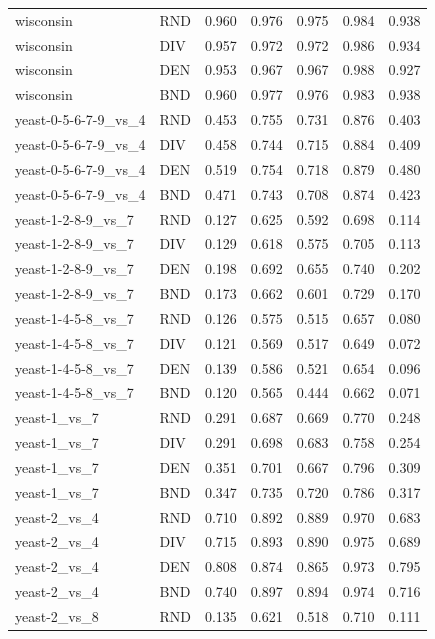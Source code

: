 \documentclass[10pt,a4paper]{article}
\begin{document}
\begin{longtable}{lllllrr}
wisconsin & RND & 0.960 & 0.976 & 0.975 & 0.984 & 0.938 \\
wisconsin & DIV & 0.957 & 0.972 & 0.972 & 0.986 & 0.934 \\
wisconsin & DEN & 0.953 & 0.967 & 0.967 & 0.988 & 0.927 \\
wisconsin & BND & 0.960 & 0.977 & 0.976 & 0.983 & 0.938 \\
yeast-0-5-6-7-9\_vs\_4 & RND & 0.453 & 0.755 & 0.731 & 0.876 & 0.403 \\
yeast-0-5-6-7-9\_vs\_4 & DIV & 0.458 & 0.744 & 0.715 & 0.884 & 0.409 \\
yeast-0-5-6-7-9\_vs\_4 & DEN & 0.519 & 0.754 & 0.718 & 0.879 & 0.480 \\
yeast-0-5-6-7-9\_vs\_4 & BND & 0.471 & 0.743 & 0.708 & 0.874 & 0.423 \\
yeast-1-2-8-9\_vs\_7 & RND & 0.127 & 0.625 & 0.592 & 0.698 & 0.114 \\
yeast-1-2-8-9\_vs\_7 & DIV & 0.129 & 0.618 & 0.575 & 0.705 & 0.113 \\
yeast-1-2-8-9\_vs\_7 & DEN & 0.198 & 0.692 & 0.655 & 0.740 & 0.202 \\
yeast-1-2-8-9\_vs\_7 & BND & 0.173 & 0.662 & 0.601 & 0.729 & 0.170 \\
yeast-1-4-5-8\_vs\_7 & RND & 0.126 & 0.575 & 0.515 & 0.657 & 0.080 \\
yeast-1-4-5-8\_vs\_7 & DIV & 0.121 & 0.569 & 0.517 & 0.649 & 0.072 \\
yeast-1-4-5-8\_vs\_7 & DEN & 0.139 & 0.586 & 0.521 & 0.654 & 0.096 \\
yeast-1-4-5-8\_vs\_7 & BND & 0.120 & 0.565 & 0.444 & 0.662 & 0.071 \\
yeast-1\_vs\_7 & RND & 0.291 & 0.687 & 0.669 & 0.770 & 0.248 \\
yeast-1\_vs\_7 & DIV & 0.291 & 0.698 & 0.683 & 0.758 & 0.254 \\
yeast-1\_vs\_7 & DEN & 0.351 & 0.701 & 0.667 & 0.796 & 0.309 \\
yeast-1\_vs\_7 & BND & 0.347 & 0.735 & 0.720 & 0.786 & 0.317 \\
yeast-2\_vs\_4 & RND & 0.710 & 0.892 & 0.889 & 0.970 & 0.683 \\
yeast-2\_vs\_4 & DIV & 0.715 & 0.893 & 0.890 & 0.975 & 0.689 \\
yeast-2\_vs\_4 & DEN & 0.808 & 0.874 & 0.865 & 0.973 & 0.795 \\
yeast-2\_vs\_4 & BND & 0.740 & 0.897 & 0.894 & 0.974 & 0.716 \\
yeast-2\_vs\_8 & RND & 0.135 & 0.621 & 0.518 & 0.710 & 0.111 \\

\end{longtable}
\end{document}
